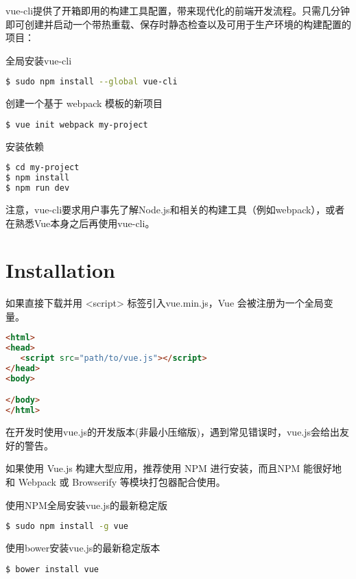 vue-cli提供了开箱即用的构建工具配置，带来现代化的前端开发流程。只需几分钟即可创建并启动一个带热重载、保存时静态检查以及可用于生产环境的构建配置的项目：


\begin{compactitem}
\item 全局安装vue-cli

\begin{lstlisting}[language=bash]
$ sudo npm install --global vue-cli
\end{lstlisting}

\item 创建一个基于 webpack 模板的新项目

\begin{lstlisting}[language=bash]
$ vue init webpack my-project
\end{lstlisting}

\item 安装依赖

\begin{lstlisting}[language=bash]
$ cd my-project
$ npm install
$ npm run dev
\end{lstlisting}
\end{compactitem}

注意，vue-cli要求用户事先了解Node.js和相关的构建工具（例如webpack），或者在熟悉Vue本身之后再使用vue-cli。





\section{Installation}


如果直接下载并用 <script> 标签引入vue.min.js，Vue 会被注册为一个全局变量。

\begin{lstlisting}[language=HTML]
<html>
<head>
   <script src="path/to/vue.js"></script>
</head>
<body>

</body>
</html>
\end{lstlisting}

在开发时使用vue.js的开发版本(非最小压缩版)，遇到常见错误时，vue.js会给出友好的警告。

如果使用 Vue.js 构建大型应用，推荐使用 NPM 进行安装，而且NPM 能很好地和 Webpack 或 Browserify 等模块打包器配合使用。

\begin{compactitem}
\item 使用NPM全局安装vue.js的最新稳定版

\begin{lstlisting}[language=bash]
$ sudo npm install -g vue
\end{lstlisting}

\item 使用bower安装vue.js的最新稳定版本

\begin{lstlisting}[language=bash]
$ bower install vue
\end{lstlisting}
\end{compactitem}


